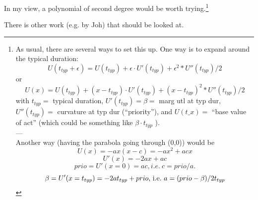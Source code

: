 In  my view, a polynomial of second degree would be worth trying.\footnote{%
%
As  usual,  there are several ways to set this up. One way is to  expand around the  typical duration:
\[
U(t_{typ} + \epsilon) = U(t_{typ}) + \epsilon \cdot U'(t_{typ}) + \epsilon^2 * U''(t_{typ})/2
\]
or
\[
U(x) = U(t_{typ}) + (x-t_{typ}) \cdot U'(t_{typ}) + (x-t_{typ})^2 * U''(t_{typ})/2
\]
with $t_{typ} =$ typical duration, $U'(t_{typ}) = \beta =$ marg utl at typ dur, $U''(t_{typ}) =$  curvature at typ dur (``priority''), and $U(t\_x) =$ ``base value of act'' (which could be something like $\beta \cdot t_{typ}$ ).
\\
---
\\
Another way (having the parabola going through (0,0)) would be
\[
U(x) = - a x ( x - c ) = - a x^2 + a c x
\]
\[
U'(x) = - 2 a x + a c
\]
\[
prio = U'(x=0) = a c , i.e.\ c = prio/a .
\]
\[
\beta = U'(x=t_{typ}) = - 2 a t_{typ} + prio \hbox{, i.e.\ } a = (prio - \beta)/2t_{typ}
\]
}

There is other work (e.g. by Joh) that should be looked at.

